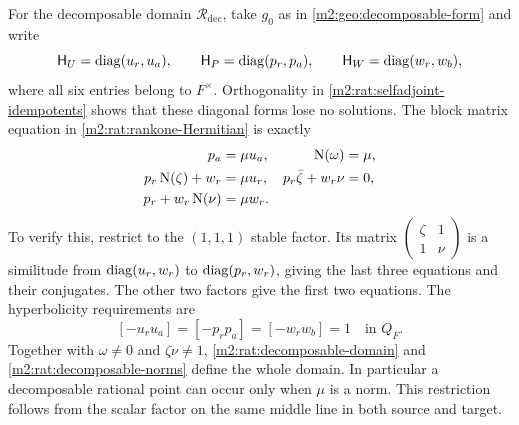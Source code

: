 For the decomposable domain $\mathscr R_{\mathrm{dec}}$,
take $g_0$ as in \eqref{m2:geo:decomposable-form} and write
\begin{equation}\label{m2:rat:decomposable-forms}
 \mathsf H_U=\operatorname{diag}(u_r,u_a),\qquad
 \mathsf H_P=\operatorname{diag}(p_r,p_a),\qquad
 \mathsf H_W=\operatorname{diag}(w_r,w_b),
\end{equation}
where all six entries belong to $F^\times$.  Orthogonality
in \cref{m2:rat:selfadjoint-idempotents} shows that these
diagonal forms lose no solutions.  The block matrix
equation in \eqref{m2:rat:rankone-Hermitian} is exactly
\begin{align}
 p_a&=\mu u_a,& \operatorname{N}(\omega)&=\mu,
       \label{m2:rat:decomposable-domain}\\
 p_r\operatorname{N}(\zeta)+w_r&=\mu u_r,&
 p_r\bar\zeta+w_r\nu&=0,\notag\\
 p_r+w_r\operatorname{N}(\nu)&=\mu w_r.&&\notag
\end{align}
To verify this, restrict to the $(1,1,1)$ stable factor.
Its matrix $\left(\begin{smallmatrix}\zeta&1\\1&\nu\end{smallmatrix}\right)$
is a similitude from $\operatorname{diag}(u_r,w_r)$ to
$\operatorname{diag}(p_r,w_r)$, giving the last three equations and
their conjugates.  The other two factors give the first
two equations.  The hyperbolicity requirements are
\begin{equation}\label{m2:rat:decomposable-norms}
 [-u_ru_a]=[-p_rp_a]=[-w_rw_b]=1\quad\text{in }Q_F.
\end{equation}
Together with $\omega\ne0$ and $\zeta\nu\ne1$,
\eqref{m2:rat:decomposable-domain} and
\eqref{m2:rat:decomposable-norms} define the whole domain.
In particular a decomposable rational point can occur
only when $\mu$ is a norm.  This restriction follows
from the scalar factor on the same middle line in both
source and target.

